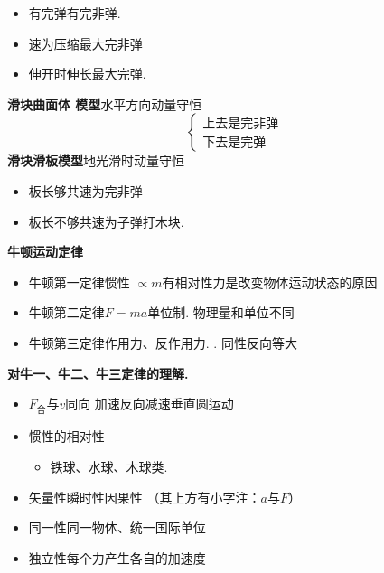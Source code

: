\begin{itemize}
\item 有完弹\quad 有完非弹.
\item {}速为压缩最大\quad 完非弹 %
\item 伸开时伸长最大\quad 完弹. %
\end{itemize}
\textbf{滑块曲面体 模型}\quad 水平方向动量守恒
\[ \left\{\begin{array}{l}\text{上去是完非弹}\\[2pt] \text{下去是完弹}\end{array}\right. \]
\textbf{滑块滑板模型}\quad 地光滑时动量守恒
\begin{itemize}
\item 板长够共速为完非弹
\item 板长不够共速为子弹打木块.
\end{itemize}
\textbf{牛顿运动定律}
\begin{itemize}
\item 牛顿第一定律\quad 惯性 $\propto m$\quad 有相对性\quad 力是改变物体运动状态的原因 %
\item 牛顿第二定律\quad $F=ma$\quad 单位制. 物理量和单位不同
\item 牛顿第三定律\quad 作用力、反作用力. . 同性反向等大
\end{itemize}
\textbf{对牛一、牛二、牛三定律的理解.}
\begin{itemize}
\item $F_{\text{合}}$与$v$同向 加速\quad 反向减速\quad 垂直圆运动 %
\item 惯性的相对性
  \begin{itemize}
  \item 铁球、水球、木球类.
  \end{itemize}
\item 矢量性\quad 瞬时性\quad 因果性 \quad （其上方有小字注：$a$与$F$）
\item 同一性\quad 同一物体、统一国际单位
\item 独立性\quad 每个力产生各自的加速度
\end{itemize}
